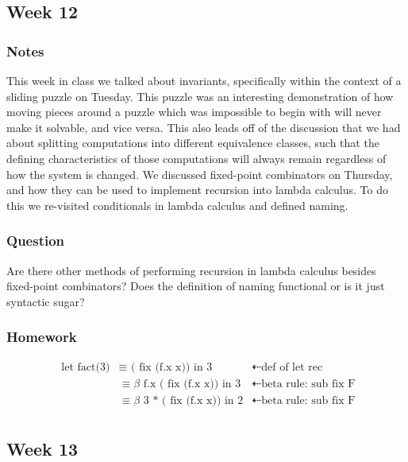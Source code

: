 \documentclass{article}
\theoremstyle{theorem}
\theoremstyle{definition}
\theoremstyle{remark}
\begin{document}
\begin{center}
  \end{center}

\subsection{Week 12}

\subsubsection*{Notes} This week in class we talked about invariants, specifically within the context of a sliding puzzle on Tuesday. This puzzle was an interesting demonstration of how moving pieces around a puzzle which was impossible to begin with will never make it solvable, and vice versa. This also leads off of the discussion that we had about splitting computations into different equivalence classes, such that the defining characteristics of those computations will always remain regardless of how the system is changed. We discussed fixed-point combinators on Thursday, and how they can be used to implement recursion into lambda calculus. To do this we re-visited conditionals in lambda calculus and defined naming.

\subsubsection*{Question} Are there other methods of performing recursion in lambda calculus besides fixed-point combinators? Does the definition of naming functional or is it just syntactic sugar?

\subsubsection*{Homework}

\[
\begin{aligned}
  \text{ let fact(3)} &\equiv  \text{ ( fix (f.x x)) in 3} &\dashleftarrow\text{def of let rec}\\
  &\equiv\beta\text{ f.x ( fix (f.x x)) in 3} &\dashleftarrow\text{beta rule: sub fix F}\\
  &\equiv\beta\text{ 3 * ( fix (f.x x)) in 2} &\dashleftarrow\text{beta rule: sub fix F}\\
\end{aligned}
\]

\subsection{Week 13}
\end{document}
